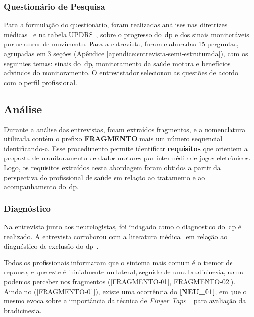 \subsubsection{Questionário de Pesquisa}
Para a formulação do questionário, foram realizadas análises nas diretrizes médicas~\cite{protpar010,national2006parkinson} e na tabela UPDRS~\cite{updrs87}, sobre o progresso do~\ac{dp} e dos sinais monitoráveis por sensores de movimento. Para a entrevista, foram elaboradas 15 perguntas, agrupadas em 3 seções (Apêndice \ref{apendice:entrevista-semi-estruturada}), com os seguintes temas: sinais do~\ac{dp}, monitoramento da saúde motora e benefícios advindos do monitoramento. O entrevistador selecionou as questões de acordo com o perfil profissional.

\subsection{Análise}
Durante a análise das entrevistas, foram extraídos fragmentos, e a nomenclatura utilizada contém o prefixo \textbf{FRAGMENTO} mais um número sequencial identificando-o. Esse procedimento permite identificar \textbf{requisitos} que orientem a proposta de monitoramento de dados motores por intermédio de jogos eletrônicos. Logo, os requisitos extraídos nesta abordagem foram obtidos a partir da perspectiva do profissional de saúde em relação ao tratamento e ao acompanhamento do~\ac{dp}. 

\subsubsection{Diagnóstico}\label{section:analise_diagnostico}

Na entrevista junto aos neurologistas, foi indagado como o diagnostico do~\ac{dp} é realizado.  A entrevista corroborou com a literatura médica~\cite{tolosa06,abn2010} em relação ao diagnóstico de exclusão do \ac{dp}~\cite{protpar010,national2006parkinson}.  

Todos os profissionais informaram que o sintoma mais comum é o tremor de repouso, e que este é inicialmente unilateral, seguido de uma bradicinesia, como podemos perceber nos fragmentos ([FRAGMENTO-01], FRAGMENTO-02]). Ainda no ([FRAGMENTO-01]), existe uma ocorrência do \textbf{[NEU\_01]}, em que o mesmo evoca sobre a importância da técnica de \textit{Finger Taps} ~\cite{updrs87} para avaliação da bradicinesia.




